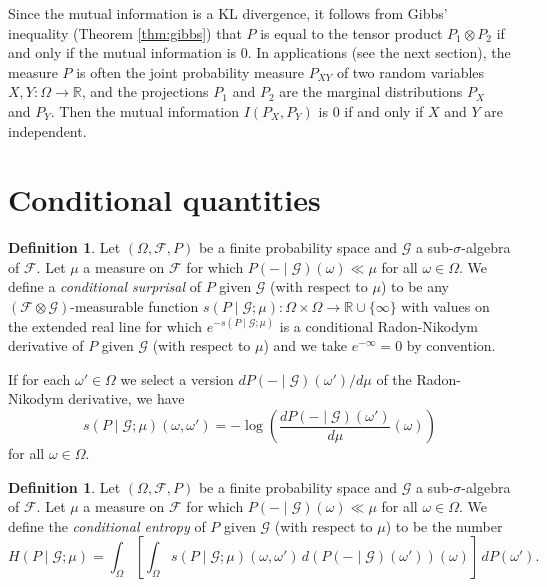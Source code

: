 \documentclass[11pt]{book}
\theoremstyle{definition}
\newtheorem{defn}[thm]{Definition}
\numberwithin{equation}{section}
\begin{document}
Since the mutual information is a KL divergence, it follows from Gibbs' inequality (Theorem \ref{thm:gibbs}) that $P$ is equal to the tensor product $P_1 \otimes P_2$ if and only if the mutual information is $0$. In applications (see the next section), the measure $P$ is often the joint probability measure $P_{XY}$ of two random variables $X,Y: \Omega \to \mathbb{R}$, and the projections $P_1$ and $P_2$ are the marginal distributions $P_X$ and $P_Y$. Then the mutual information $I(P_X,P_Y)$ is $0$ if and only if $X$ and $Y$ are independent.

\section{Conditional quantities}

\begin{defn}
	Let $(\Omega,\mathcal{F},P)$ be a finite probability space and $\mathcal{G}$ a sub-$\sigma$-algebra of $\mathcal{F}$. Let $\mu$ a measure on $\mathcal{F}$ for which $P(-\mid \mathcal{G})(\omega) \ll \mu$ for all $\omega\in \Omega$. We define a \textit{conditional surprisal} of $P$ given $\mathcal{G}$ (with respect to $\mu$) to be any $(\mathcal{F} \otimes \mathcal{G})$-measurable function $s(P\mid \mathcal{G};\mu): \Omega \times \Omega \to \mathbb{R} \cup \{\infty\}$ with values on the extended real line for which $e^{-s(P\mid \mathcal{G};\mu)}$ is a conditional Radon-Nikodym derivative of $P$ given $\mathcal{G}$ (with respect to $\mu$) and we take $e^{-\infty}=0$ by convention.
\end{defn}

If for each $\omega'\in \Omega$ we select a version $dP(-\mid \mathcal{G})(\omega')/d\mu$ of the Radon-Nikodym derivative, we have
\[
	s(P\mid \mathcal{G};\mu)(\omega,\omega') = -\log{ \left( \frac{dP(-\mid \mathcal{G})(\omega')}{d\mu}(\omega) \right)}
\]
for all $\omega\in \Omega$.

\begin{defn}
	Let $(\Omega,\mathcal{F},P)$ be a finite probability space and $\mathcal{G}$ a sub-$\sigma$-algebra of $\mathcal{F}$. Let $\mu$ a measure on $\mathcal{F}$ for which $P(-\mid \mathcal{G})(\omega) \ll \mu$ for all $\omega\in \Omega$. We define the \textit{conditional entropy} of $P$ given $\mathcal{G}$ (with respect to $\mu$) to be the number
	\[
		H(P\mid \mathcal{G} ;\mu) = \int_\Omega \left[ \int_\Omega s(P\mid \mathcal{G};\mu)(\omega,\omega') \, d\left(P(-\mid \mathcal{G})(\omega')\right)(\omega) \right] \, dP(\omega').
	\]
\end{defn}
\end{document}
